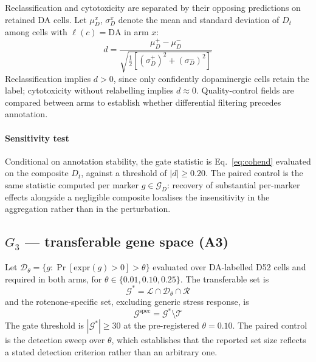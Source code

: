 \documentclass[5p,times,twocolumn]{elsarticle}
\begin{document}
Reclassification and cytotoxicity are separated by their opposing predictions on
retained DA cells. Let $\mu_D^{x}$, $\sigma_D^{x}$ denote the mean and standard
deviation of $D_t$ among cells with $\ell(c)=\mathrm{DA}$ in arm $x$:
\begin{equation}
d = \frac{\mu_D^{+}-\mu_D^{-}}
{\sqrt{\tfrac{1}{2}\left[(\sigma_D^{+})^2+(\sigma_D^{-})^2\right]}}
\label{eq:cohend}
\end{equation}
Reclassification implies $d>0$, since only confidently dopaminergic cells retain
the label; cytotoxicity without relabelling implies $d\approx 0$.
Quality-control fields are compared between arms to establish whether
differential filtering precedes annotation.

\paragraph{\textbf{Sensitivity test}} Conditional on annotation stability, the
gate statistic is Eq.~\eqref{eq:cohend} evaluated on the composite $D_t$,
against a threshold of $|d| \geq 0.20$. The paired control is the same statistic
computed per marker $g \in \mathcal{G}_D$: recovery of substantial per-marker
effects alongside a negligible composite localises the insensitivity in the
aggregation rather than in the perturbation.

\subsection{\textbf{$G_3$ --- transferable gene space (A3)}}
\label{sec:genespace}

Let $\mathcal{D}_\theta = \{g : \Pr[\mathrm{expr}(g)>0] > \theta\}$ evaluated
over DA-labelled D52 cells and required in both arms, for
$\theta\in\{0.01,0.10,0.25\}$. The transferable set is
\begin{equation}
\mathcal{G}^{\ast} = \mathcal{L} \cap \mathcal{D}_\theta \cap \mathcal{R}
\end{equation}
and the rotenone-specific set, excluding generic stress response, is
\begin{equation}
\mathcal{G}^{\mathrm{spec}} = \mathcal{G}^{\ast} \setminus \mathcal{T}
\end{equation}
The gate threshold is $|\mathcal{G}^{\ast}| \geq 30$ at the pre-registered
$\theta = 0.10$. The paired control is the detection sweep over $\theta$, which
establishes that the reported set size reflects a stated detection criterion
rather than an arbitrary one.
\end{document}
